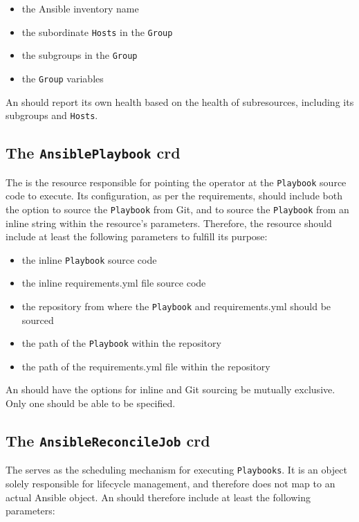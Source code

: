 \begin{itemize}
	\item{the Ansible inventory name}
	\item{the subordinate \texttt{Hosts} in the \texttt{Group}}
	\item{the subgroups in the \texttt{Group}}
	\item{the \texttt{Group} variables}
\end{itemize}

An \angroup should report its own health based on the health of subresources, including its subgroups and \texttt{Hosts}.

\clearpage
\subsection{The \texttt{AnsiblePlaybook} \gls{crd}}
The \anplaybook is the resource responsible for pointing the operator at the \texttt{Playbook} source code to execute.
Its configuration, as per the requirements, should include both the option to source the \texttt{Playbook} from Git, and to source the \texttt{Playbook} from an inline string within the resource's parameters.
Therefore, the \anplaybook resource should include at least the following parameters to fulfill its purpose:

\begin{itemize}
	\item{the inline \texttt{Playbook} source code}
	\item{the inline requirements.yml file source code}
	\item{the repository from where the \texttt{Playbook} and requirements.yml should be sourced}
	\item{the path of the \texttt{Playbook} within the repository}
	\item{the path of the requirements.yml file within the repository}
\end{itemize}

An \anplaybook should have the options for inline and Git sourcing be mutually exclusive.
Only one should be able to be specified.

\subsection{The \texttt{AnsibleReconcileJob} \gls{crd}}
The \anrecjob serves as the scheduling mechanism for executing \texttt{Playbooks}.
It is an object solely responsible for lifecycle management, and therefore does not map to an actual Ansible object.
An \anrecjob should therefore include at least the following parameters:

